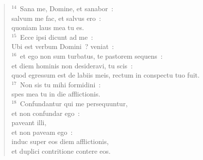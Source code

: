 \begin{verse}
${}^{14}$~Sana me, Domine, et sanabor~:\\ salvum me fac, et salvus ero~:\\ quoniam laus mea tu es.\\
${}^{15}$~Ecce ipsi dicunt ad me~:\\ Ubi est verbum Domini~? veniat~:\\
${}^{16}$~et ego non sum turbatus, te pastorem sequens~:\\ et diem hominis non desideravi, tu scis~:\\ quod egressum est de labiis meis, rectum in conspectu tuo fuit.\\
${}^{17}$~Non sis tu mihi formidini~:\\ spes mea tu in die afflictionis.\\
${}^{18}$~Confundantur qui me persequuntur,\\ et non confundar ego~:\\ paveant illi,\\ et non paveam ego~:\\ induc super eos diem afflictionis,\\ et duplici contritione contere eos.\end{verse}


